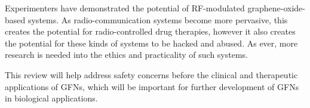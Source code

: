 \documentclass[twoside,twocolumn,9pt]{article}
\renewcommand{\refname}{Notes and references}
\begin{document}
Experimenters have demonstrated the potential of RF-modulated graphene-oxide-based systems. As radio-communication systems become more pervasive, this creates the potential for radio-controlled drug therapies, however it also creates the potential for these kinds of systems to be hacked and abused. As ever, more research is needed into the ethics and practicality of such systems. 

This review will help address safety concerns before the clinical and therapeutic applications of GFNs, which will be important for further development of GFNs in biological applications.



\balance


\end{document}
